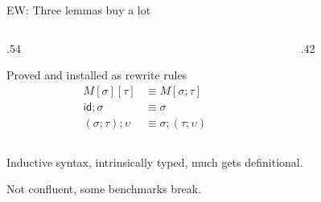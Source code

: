 \documentclass[pdftex,aspectratio=169]{beamer}
\newcommand{\refl}{\texttt{refl}}
\begin{document}
\begin{frame}{EW: Three lemmas buy a lot}
  \begin{columns}[c,onlytextwidth]
    \begin{column}{.54\textwidth}
      \begin{block}{Proved and installed as rewrite rules}
        \vspace{-\baselineskip}
        \begin{align*}
          M[\sigma][\tau] &\equiv M[\sigma \mathbin{;} \tau]\\
          \mathsf{id}\mathbin{;}\sigma &\equiv \sigma\\
          (\sigma\mathbin{;}\tau)\mathbin{;}\upsilon
            &\equiv \sigma\mathbin{;}(\tau\mathbin{;}\upsilon)
        \end{align*}
      \end{block}
    \end{column}
    \begin{column}{.42\textwidth}
      \centering
    \end{column}
  \end{columns}

  \vspace{.45em}
  \begin{description}
  \item[Pros:] \textcolor{alu-darkblue}{Inductive syntax, intrinsically typed,
      much gets definitional.}
  \item<2->[Cons:] \textcolor{alu-darkblue}{Not confluent, some benchmarks break.}
  \end{description}
\end{frame}
\end{document}
